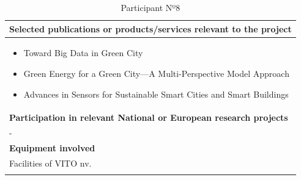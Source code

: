 \begin{longtable}[H]{|p{0.7cm}|p{4cm}|p{7cm}|p{1.3cm}|}
	\multicolumn{4}{|p{13cm}|}{\textbf{Selected publications or products/services relevant to the project}}  \\ \hline
	
	\multicolumn{4}{|p{14.5cm}|}{
	\begin{itemize}
		\item Toward Big Data in Green City
		\item Green Energy for a Green City—A Multi-Perspective Model Approach
		\item Advances in Sensors for Sustainable Smart Cities and Smart Buildings
	\end{itemize}}  \\ \hline

	\multicolumn{4}{|p{13cm}|}{\textbf{Participation in relevant National or European research projects}}  \\ \hline
	
	\multicolumn{4}{|p{14.5cm}|}{-}  \\ \hline
	
	\multicolumn{4}{|p{13cm}|}{\textbf{Equipment involved}}  \\ \hline
	
	\multicolumn{4}{|p{14.5cm}|}{Facilities of VITO nv.}  \\ \hline
	\caption{Participant Nº8}
\end{longtable}